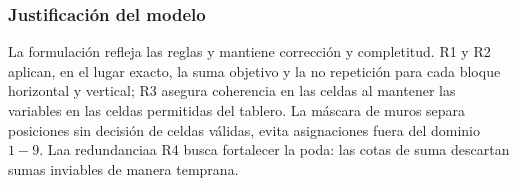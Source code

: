 \subsubsection*{Justificación del modelo}
La formulación refleja las reglas y mantiene corrección y completitud. R1 y R2 aplican, en el lugar exacto, la suma objetivo y la no repetición para cada bloque horizontal y vertical; R3 asegura coherencia en las celdas al mantener las variables en las celdas permitidas del tablero. La máscara de muros separa posiciones sin decisión de celdas válidas, evita asignaciones fuera del dominio \(1\!-\!9\). Laa redundanciaa R4 busca fortalecer la poda: las cotas de suma descartan sumas inviables de manera temprana.